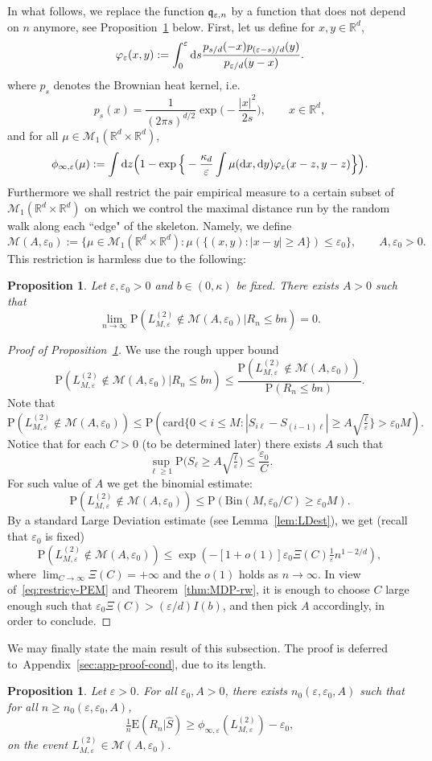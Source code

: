 \documentclass[a4paper,11pt]{amsart}
\numberwithin{equation}{section}
\newtheorem{proposition}[theorem]{Proposition}
\newcommand{\bbR}{{\ensuremath{\mathbb R}} }
\newcommand{\cM}{{\ensuremath{\mathcal M}} }
\newcommand{\gep}{\varepsilon}
\newcommand{\gk}{\kappa}
\newcommand{\dd}{\text{\rm d}}             %
\newcommand\bP{\ensuremath{\mathrm{P}}}
\newcommand\bE{\ensuremath{\mathrm{E}}}
\newcommand{\card}{\mathrm{card}}
\newcommand{\8}{\infty}
\newcommand{\beq}{\begin{equation}}
\newcommand{\eeq}{\end{equation}}
\newcommand{\bin}{\mathrm{Bin}}
\begin{document}
In what follows, we replace the function $\frak{q}_{\gep,n}$ by a function that does not depend on $n$ anymore, see Proposition~\ref{pr:app-cond-range} below. First, let us define for $x,y\in\bbR^d$,
\beq\label{def:varphi}
\varphi_\gep(x,y) := \int_0^\gep \dd s \frac{p_{s/d}(-x)p_{(\gep-s)/d}(y)}{p_{\gep/d}(y-x)}.
\eeq
where $p_s$ denotes the Brownian heat kernel, i.e.\
\beq
\label{eq:Bheatk}
p_s(x) = \frac{1}{(2\pi s)^{d/2}}\exp\Big(-\frac{|x|^2}{2s}\Big),
\qquad x\in\bbR^d,
\eeq
and for all $\mu\in \cM_1(\bbR^d\times\bbR^d)$, 
\beq
\label{eq:def-phi-infty-rho}
\phi_{\infty,\gep}(\mu)
:=\int  \dd z
\Big(1 - \exp\Big\{-\frac{\gk_d}{\gep} \int \mu(\dd x, \dd y) \varphi_\gep(x-z,y-z)\Big\}\Big).
\eeq
%
Furthermore we shall restrict the pair empirical measure to a certain subset of $\cM_1(\bbR^d\times \bbR^d)$ on which we control the maximal distance run by the random walk along each ``edge" of the skeleton. Namely, we define 
\beq
\cM(A,\gep_0) :=
\{\mu\in\cM_1(\bbR^d\times \bbR^d) \colon
\mu(\{(x,y)\colon |x-y| \ge A\}) \le \gep_0\}, \qquad
A,\gep_0 >0.
\eeq
This restriction is harmless due to the following:
\begin{proposition}
\label{pr:restricy-PEM}
Let $\gep, \gep_0 >0$ and $b\in(0,\gk)$ be fixed. There exists $A>0$ such that
\beq
\lim_{n\to \infty} \bP(L_{M,\gep}^{(2)} \notin \cM(A,\gep_0)  | R_n \le bn) = 0.
\eeq
\end{proposition}

\begin{proof}[Proof of Proposition~\ref{pr:restricy-PEM}]
We use the rough upper bound
\beq
\label{eq:restricy-PEM}
\bP(L_{M,\gep}^{(2)} \notin \cM(A,\gep_0)  | R_n \le bn) \le
\frac{\bP(L_{M,\gep}^{(2)} \notin \cM(A,\gep_0))}{\bP(R_n \le bn)}.
\eeq
Note that
\beq
\bP(L_{M,\gep}^{(2)} \notin \cM(A,\gep_0))\leq \bP(\card\{0<i\le M \colon |S_{i\ell} - S_{(i-1)\ell}| \ge A\sqrt{\tfrac{\ell}{\gep}}\} > \gep_0 M).
\eeq
Notice that for each $C>0$ (to be determined later) there exists $A$ such that
\beq
\sup_{\ell \ge 1}\bP\Big(S_\ell \ge A\sqrt{\tfrac{\ell}{\gep}}\Big) \le \frac{\gep_0}{C}.
\eeq
For such value of $A$ we get the binomial estimate:
\beq
\bP(L_{M,\gep}^{(2)} \notin \cM(A,\gep_0))
\le \bP(\bin(M, \gep_0/C) \ge \gep_0M).
\eeq
By a standard Large Deviation estimate (see Lemma~\ref{lem:LDest}), we get (recall that $\gep_0$ is fixed)
\beq
\bP(L_{M,\gep}^{(2)} \notin \cM(A,\gep_0))
\le \exp(-[1+o(1)] \gep_0\Xi(C)\tfrac 1\gep n^{1-2/d}),
\eeq
where $\lim_{C\to \infty}\Xi(C) = +\infty$ and the $o(1)$ holds as $n\to \infty$. In view of~\eqref{eq:restricy-PEM} and Theorem~\ref{thm:MDP-rw}, it is enough to choose $C$ large enough such that $\gep_0\Xi(C) > (\gep/d) I(b)$, and then pick $A$ accordingly, in order to conclude.
\end{proof}
%
We may finally state the main result of this subsection. The proof is deferred to~Appendix~\ref{sec:app-proof-cond}, due to its length.
\begin{proposition}\label{pr:app-cond-range} Let $\gep>0$. For all $\gep_0, A >0$, there exists $n_0(\gep,\gep_0, A)$ such that for all $n\ge n_0(\gep,\gep_0, A)$,
\beq
\tfrac1n \bE(R_n|\hat S) \ge \phi_{\infty,\gep}(L_{M,\gep}^{(2)})-\gep_0,
\eeq
on the event $L_{M,\gep}^{(2)}\in \cM(A,\gep_0)$.
\end{proposition}
\end{document}
